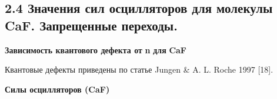 \bigskip

\subsection[2.4 Значения сил
осцилляторов для молекулы CaF. Запрещенные
переходы.]{2.4
Значения сил осцилляторов для
молекулы \foreignlanguage{english}{CaF}.
Запрещенные
переходы.}
{\centering
\textbf{Зависимость
квантового
дефекта от }\foreignlanguage{english}{\textbf{n}}\textbf{
для }\foreignlanguage{english}{\textbf{CaF}}
\par}

Квантовые дефекты приведены по
статье Jungen \& A. L. Roche 1997 [18].


\bigskip

{\centering
\textbf{Силы
осцилляторов
(}\foreignlanguage{english}{\textbf{CaF}}\textbf{)}
\par}


